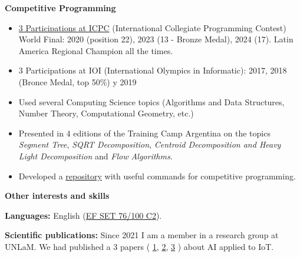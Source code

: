 \documentclass[10pt]{article}
\begin{document}
\textbf{Competitive Programming} 
\begin{itemize}[noitemsep, topsep=0pt, partopsep=0pt, parsep=0pt]
   \item \href{https://icpc.global/ICPCID/DV1XEVUDPG8J}{3 Participations at ICPC} (International Collegiate Programming Contest) World Final: 2020 (position 22), 2023 (13 - Bronze Medal), 2024 (17). Latin America Regional Champion all the times.
   \item 3 Participations at IOI (International Olympics in Informatic): 2017, 2018 (Bronce Medal, top 50\%) y 2019
    \item Used several Computing Science topics (Algorithms and Data Structures, Number Theory, Computational Geometry, etc.)
    \item Presented in 4 editions of the Training Camp Argentina on the topics \textit{Segment Tree}, \textit{SQRT Decomposition}, \textit{Centroid Decomposition and Heavy Light Decomposition} and \textit{Flow Algorithms}.
    \item Developed a \href{https://github.com/LautaroLasorsa/competitive-programming-suite}{repository} with useful commands for competitive programming.
   
\end{itemize}

\begin{center}
    \textbf{Other interests and skills}
\end{center}

\textbf{Languages:} English (\href{https://cert.efset.org/Pymcaz}{EF SET 76/100 C2}).

\textbf{Scientific publications:} Since 2021 I am a member in a research group at UNLaM. We had published a 3 papers (
\href{https://github.com/LautaroLasorsa/CONAIISI-2023}{1}, \href{https://github.com/LautaroLasorsa/CONAIISI-2024}{2},
\href{https://github.com/carlucho1/CONAIISI-2024-2}{3}
) about AI applied to IoT. 
 


\end{document}
